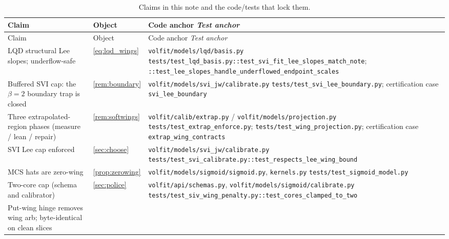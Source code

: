 \documentclass[11pt]{article}
\begin{document}
\begingroup
\small
\setlength{\tabcolsep}{4pt}
\renewcommand{\arraystretch}{1.15}
\begin{longtable}{@{}p{}p{}p{}@{}}
\caption{Claims in this note and the code/tests that lock them.}
\label{tab:trace}\\
\toprule Claim & Object & Code anchor \newline \emph{Test anchor}\\ \midrule
\endfirsthead
\toprule Claim & Object & Code anchor \newline \emph{Test anchor}\\ \midrule
\endhead
LQD structural Lee slopes; underflow-safe &
\eqref{eq:lqd_wings} &
\nolinkurl{volfit/models/lqd/basis.py}\newline
\nolinkurl{tests/test_lqd_basis.py::test_svi_fit_lee_slopes_match_note};
\nolinkurl{::test_lee_slopes_handle_underflowed_endpoint_scales}\\
\addlinespace
Buffered SVI cap: the $\beta=2$ boundary trap is closed &
\cref{rem:boundary} &
\nolinkurl{volfit/models/svi_jw/calibrate.py}\newline
\nolinkurl{tests/test_svi_lee_boundary.py};
certification case \texttt{svi\_lee\_boundary}\\
\addlinespace
Three extrapolated-region phases (measure / lean / repair) &
\cref{rem:softwings} &
\nolinkurl{volfit/calib/extrap.py} /
\nolinkurl{volfit/models/projection.py}\newline
\nolinkurl{tests/test_extrap_enforce.py};
\nolinkurl{tests/test_wing_projection.py};
certification case \texttt{extrap\_wing\_contracts}\\
\addlinespace
SVI Lee cap enforced &
\cref{sec:choose} &
\nolinkurl{volfit/models/svi_jw/calibrate.py}\newline
\nolinkurl{tests/test_svi_calibrate.py::test_respects_lee_wing_bound}\\
\addlinespace
MCS hats are zero-wing &
\cref{prop:zerowing} &
\nolinkurl{volfit/models/sigmoid/sigmoid.py},
\nolinkurl{kernels.py}\newline
\nolinkurl{tests/test_sigmoid_model.py}\\
\addlinespace
Two-core cap (schema and calibrator) &
\cref{sec:police} &
\nolinkurl{volfit/api/schemas.py},
\nolinkurl{volfit/models/sigmoid/calibrate.py}\newline
\nolinkurl{tests/test_siv_wing_penalty.py::test_cores_clamped_to_two}\\
\addlinespace
Put-wing hinge removes wing arb; byte-identical on clean slices &

\end{longtable}
\end{document}
